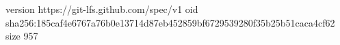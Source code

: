 version https://git-lfs.github.com/spec/v1
oid sha256:185caf4e6767a76b0e13714d87eb452859bf6729539280f35b25b51caca4cf62
size 957
